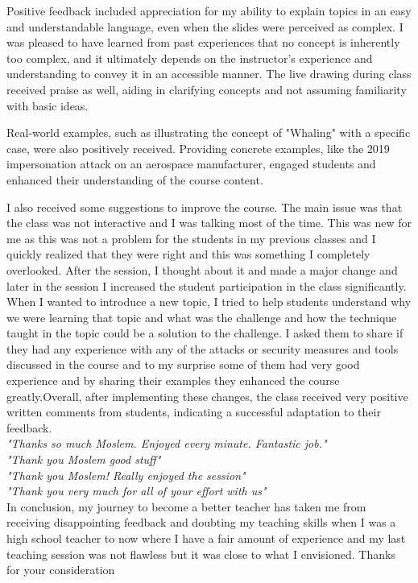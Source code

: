 Positive feedback included appreciation for my ability to explain topics in an easy and understandable language, even when the slides were perceived as complex. I was pleased to have learned from past experiences that no concept is inherently too complex, and it ultimately depends on the instructor's experience and understanding to convey it in an accessible manner. The live drawing during class received praise as well, aiding in clarifying concepts and not assuming familiarity with basic ideas.

Real-world examples, such as illustrating the concept of "Whaling" with a specific case, were also positively received. Providing concrete examples, like the 2019 impersonation attack on an aerospace manufacturer, engaged students and enhanced their understanding of the course content.

I also received some suggestions to improve the course. The main issue was that the class was not interactive and I was talking most of the time. This was new for me as this was not a problem for the students in my previous classes and I quickly realized that they were right and this was something I completely overlooked. After the session, I thought about it and made a major change and later in the session I increased the student participation in the class significantly. When I wanted to introduce a new topic, I tried to help students understand why we were learning that topic and what was the challenge and how the technique taught in the topic could be a solution to the challenge. I asked them to share if they had any experience with any of the attacks or security measures and tools discussed in the course and to my surprise some of them had very good experience and by sharing their examples they enhanced the course greatly.Overall, after implementing these changes, the class received very positive written comments from students, indicating a successful adaptation to their feedback.\\


\emph{"Thanks so much Moslem. Enjoyed every minute. Fantastic job."}\\

\emph{"Thank you Moslem good stuff"}\\

\emph{"Thank you Moslem! Really enjoyed the session"}\\

\emph{"Thank you very much for all of your effort with us"}\\


In conclusion, my journey to become a better teacher has taken me from receiving disappointing feedback and doubting my teaching skills when I was a high school teacher to now where I have a fair amount of experience and my last teaching session was not flawless but it was close to what I envisioned. Thanks for your consideration 




